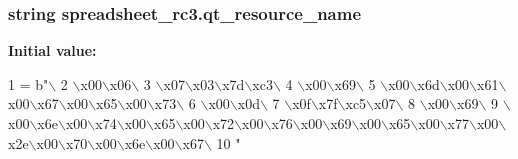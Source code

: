 \subsubsection[{qt\+\_\+resource\+\_\+name}]{\setlength{\rightskip}{0pt plus 5cm}string spreadsheet\+\_\+rc3.\+qt\+\_\+resource\+\_\+name}\label{namespacespreadsheet__rc3_a8b1646ec199a0a69b0bd650787da6811}
{\bfseries Initial value\+:}
\begin{DoxyCode}
1 = b\textcolor{stringliteral}{"\(\backslash\)}
2 \textcolor{stringliteral}{\(\backslash\)x00\(\backslash\)x06\(\backslash\)}
3 \textcolor{stringliteral}{\(\backslash\)x07\(\backslash\)x03\(\backslash\)x7d\(\backslash\)xc3\(\backslash\)}
4 \textcolor{stringliteral}{\(\backslash\)x00\(\backslash\)x69\(\backslash\)}
5 \textcolor{stringliteral}{\(\backslash\)x00\(\backslash\)x6d\(\backslash\)x00\(\backslash\)x61\(\backslash\)x00\(\backslash\)x67\(\backslash\)x00\(\backslash\)x65\(\backslash\)x00\(\backslash\)x73\(\backslash\)}
6 \textcolor{stringliteral}{\(\backslash\)x00\(\backslash\)x0d\(\backslash\)}
7 \textcolor{stringliteral}{\(\backslash\)x0f\(\backslash\)x7f\(\backslash\)xc5\(\backslash\)x07\(\backslash\)}
8 \textcolor{stringliteral}{\(\backslash\)x00\(\backslash\)x69\(\backslash\)}
9 \textcolor{stringliteral}{\(\backslash\)x00\(\backslash\)x6e\(\backslash\)x00\(\backslash\)x74\(\backslash\)x00\(\backslash\)x65\(\backslash\)x00\(\backslash\)x72\(\backslash\)x00\(\backslash\)x76\(\backslash\)x00\(\backslash\)x69\(\backslash\)x00\(\backslash\)x65\(\backslash\)x00\(\backslash\)x77\(\backslash\)x00\(\backslash\)x2e\(\backslash\)x00\(\backslash\)x70\(\backslash\)x00\(\backslash\)x6e\(\backslash\)x00\(\backslash\)x67\(\backslash\)}
10 \textcolor{stringliteral}{"}
\end{DoxyCode}
\hypertarget{namespacespreadsheet__rc3_adee2ea5b86af0627c8e914fc358b0c84}{}
